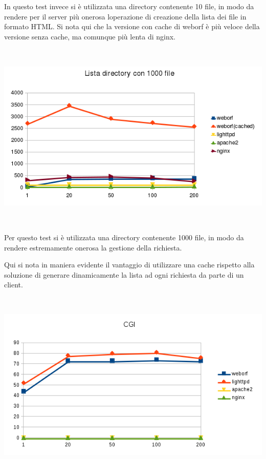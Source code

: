 \documentclass[a4paper,11pt]{article}
\makeatletter
\newcommand\captionof[1]{\def\@captype{#1}\caption}
\makeatother
\begin{document}
{\sffamily
In questo test invece si \`e utilizzata una directory contenente 10
file, in modo da rendere per il server pi\`u onerosa
l{\textquotesingle}operazione di creazione della lista dei file in
formato HTML. Si nota qui che la versione con cache di weborf \`e pi\`u
veloce della versione senza cache, ma comunque pi\`u lenta di nginx.}


\bigskip

\begin{minipage}{16cm}
\includegraphics[width=16cm,height=8.999cm]{tesi-img7.png}
\captionof{figure}{Comparazione velocit\`a sull{\textquotesingle}invio
di una lista di files contenuti in una directory con 1000 file.}
\end{minipage}

{\sffamily
Per questo test si \`e utilizzata una directory contenente 1000 file, in
modo da rendere estremamente onerosa la gestione della richiesta.}

{\sffamily
Qui si nota in maniera evidente il vantaggio di utilizzare una cache
rispetto alla soluzione di generare dinamicamente la lista ad ogni
richiesta da parte di un client.}


\bigskip

\begin{minipage}{16cm}
\includegraphics[width=16cm,height=8.999cm]{tesi-img8.png}
\captionof{figure}{Comparazione performances di una semplice pagina php
che chiama la funzione phpinfo() utilizzata tramite protocollo CGI.
Nginx non supporta CGI, apache2 non supporta
l{\textquotesingle}utilizzo di php tramite CGI.}
\end{minipage}
\end{document}

